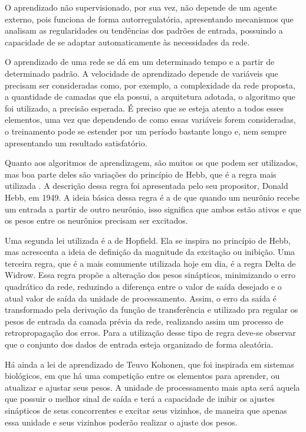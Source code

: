 O aprendizado não supervisionado, por sua vez, não depende de um agente externo, pois funciona de forma autorregulatória, apresentando 
mecanismos que analisam as regularidades ou tendências dos padrões de entrada, possuindo a capacidade de se adaptar automaticamente às 
necessidades da rede. 

O aprendizado de uma rede se dá em um determinado tempo e a partir de determinado padrão. 
A velocidade de aprendizado depende de variáveis que precisam ser consideradas como, por exemplo, a complexidade da rede proposta, 
a quantidade de camadas que ela possui, a arquitetura adotada, o algoritmo que foi utilizado, a precisão esperada. 
É preciso que se esteja atento a todos esses elementos, uma vez que dependendo de como essas variáveis forem consideradas, 
o treinamento pode se estender por um período bastante longo e, nem sempre apresentando um resultado satisfatório.

Quanto aos algoritmos de aprendizagem, são muitos os que podem ser utilizados, mas boa parte deles são variações do princípio de Hebb, 
que é a regra mais utilizada \cite{Barreto2002}. A descrição dessa regra foi apresentada pelo seu propositor, Donald Hebb, em 1949. 
A ideia básica dessa regra é a de que quando um neurônio recebe um entrada a partir de outro neurônio, isso significa que ambos 
estão ativos e que os pesos entre os neurônios precisam ser excitados.

Uma segunda lei utilizada é a de Hopfield. Ela se inspira no princípio de Hebb, mas acrescenta a ideia de definição da magnitude da 
excitação ou inibição. Uma terceira regra, que é a mais comumente utilizada hoje em dia, é a regra Delta de Widrow. 
Essa regra propõe a alteração dos pesos sinápticos, minimizando o erro quadrático da rede, reduzindo a diferença entre o valor de saída 
desejado e o atual valor de saída da unidade de processamento. 
Assim, o erro da saída é transformado pela derivação da função de transferência e utilizado pra regular os pesos de entrada da camada 
prévia da rede, realizando assim um processo de retropropagação dos erros. 
Para a utilização desse tipo de regra deve-se observar que o conjunto dos dados de entrada esteja organizado de forma aleatória. 

Há ainda a lei de aprendizado de Teuvo Kohonen, que foi inspirada em sistemas biológicos, em que há uma competição entre os elementos 
para aprender, ou atualizar e ajustar seus pesos. A unidade de processamento mais apta será aquela que possuir o melhor sinal de 
saída e terá a capacidade de inibir os ajustes sinápticos de seus concorrentes e excitar seus vizinhos, de maneira que apenas essa 
unidade e seus vizinhos poderão realizar o ajuste dos pesos.

